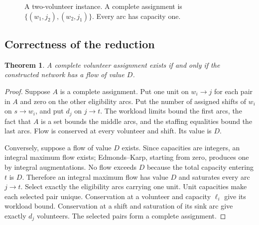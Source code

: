 \documentclass[sigconf,nonacm]{acmart}
\newtheorem{theorem}{Theorem}
\begin{document}
\begin{figure}[t]
\centering
{}
\caption{A two-volunteer instance. A complete assignment is
$\{(w_1,j_2),(w_2,j_1)\}$. Every arc has capacity one.}
\label{fig:network}
\end{figure}

\subsection{Correctness of the reduction}
\begin{theorem}
A complete volunteer assignment exists if and only if the constructed network
has a flow of value $D$.
\end{theorem}
\begin{proof}
Suppose $A$ is a complete assignment. Put one unit on $w_i\to j$ for each
pair in $A$ and zero on the other eligibility arcs. Put the number of assigned
shifts of $w_i$ on $s\to w_i$, and put $d_j$ on $j\to t$.
The workload limits bound the first arcs, the fact that $A$ is a set bounds
the middle arcs, and the staffing equalities bound the last arcs. Flow is
conserved at every volunteer and shift. Its value is $D$.

Conversely, suppose a flow of value $D$ exists. Since capacities are integers,
an integral maximum flow exists; Edmonds--Karp, starting from zero, produces
one by integral augmentations. No flow exceeds $D$ because the total capacity
entering $t$ is $D$. Therefore an integral maximum flow has value $D$ and
saturates every arc $j\to t$. Select exactly the eligibility arcs carrying
one unit. Unit capacities make each selected pair unique. Conservation at a
volunteer and capacity $\ell_i$ give its workload bound. Conservation at a
shift and saturation of its sink arc give exactly $d_j$ volunteers. The
selected pairs form a complete assignment.
\end{proof}
\end{document}
